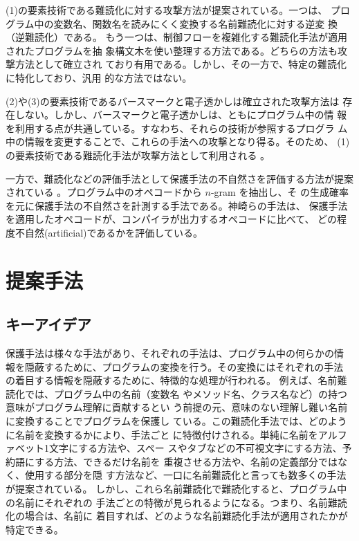 \documentclass[12pt,twoside]{jreport}
\begin{document}
(1)の要素技術である難読化に対する攻撃方法が提案されている。一つは、
プログラム中の変数名、関数名を読みにくく変換する名前難読化に対する逆変
換（逆難読化）である\cite{cimato05jss}。
%
もう一つは、制御フローを複雑化する難読化手法が適用されたプログラムを抽
象構文木を使い整理する方法である。どちらの方法も攻撃方法として確立され
ており有用である。しかし、その一方で、特定の難読化に特化しており、汎用
的な方法ではない。

(2)や(3)の要素技術であるバースマークと電子透かしは確立された攻撃方法は
存在しない。しかし、バースマークと電子透かしは、ともにプログラム中の情
報を利用する点が共通している。すなわち、それらの技術が参照するプログラ
ム中の情報を変更することで、これらの手法への攻撃となり得る。そのため、
(1)の要素技術である難読化手法が攻撃方法として利用される
\cite{tian13hpcc}。

一方で、難読化などの評価手法として保護手法の不自然さを評価する方法が提案されている
\cite{kanzaki14ipsj}。プログラム中のオペコードから $n$-gram を抽出し、そ
の生成確率を元に保護手法の不自然さを計測する手法である。神崎らの手法は、
保護手法を適用したオペコードが、コンパイラが出力するオペコードに比べて、
どの程度不自然(artificial)であるかを評価している。

\chapter{提案手法}\label{sect:proposedmethod}

\section{キーアイデア}
保護手法は様々な手法があり、それぞれの手法は、プログラム中の何らかの情
報を隠蔽するために、プログラムの変換を行う。その変換にはそれぞれの手法
の着目する情報を隠蔽するために、特徴的な処理が行われる。
%
例えば、名前難読化\cite{tyma00patent}では、プログラム中の名前（変数名
  やメソッド名、クラス名など）の持つ意味がプログラム理解に貢献するとい
う前提の元、意味のない理解し難い名前に変換することでプログラムを保護し
ている。この難読化手法では、どのように名前を変換するかにより、手法ごと
に特徴付けされる。単純に名前をアルファベット1文字にする方法や、スペー
スやタブなどの不可視文字にする方法、予約語にする方法、できるだけ名前を
重複させる方法\cite{dasho}や、名前の定義部分ではなく、使用する部分を隠
す方法\cite{tamada07ieice}など、一口に名前難読化と言っても数多くの手法
が提案されている。
%
しかし、これら名前難読化で難読化すると、プログラム中の名前にそれぞれの
手法ごとの特徴が見られるようになる。つまり、名前難読化の場合は、名前に
着目すれば、どのような名前難読化手法が適用されたかが特定できる。
\end{document}
